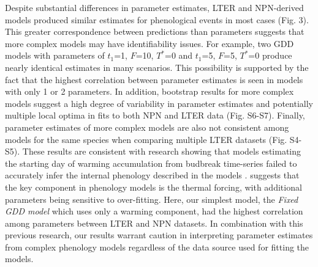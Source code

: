 \documentclass[fleqn,12pt,lineno]{article}
\begin{document}
Despite substantial differences in parameter estimates, LTER and NPN-derived models produced similar estimates for phenological events in most cases (Fig. 3). This greater correspondence between predictions than parameters suggests that more complex models may have identifiability issues. For example, two GDD models with parameters of $t_{1}$=1, $F$=10, $T^*$=0 and $t_{1}$=5, $F$=5, $T^*$=0 produce nearly identical estimates in many scenarios. This possibility is supported by the fact that the highest correlation between parameter estimates is seen in models with only 1 or 2 parameters. In addition, bootstrap results for more complex models suggest a high degree of variability in parameter estimates and potentially multiple local optima in fits to both NPN and LTER data (Fig. S6-S7). Finally, parameter estimates of more complex models are also not consistent among models for the same species when comparing multiple LTER datasets (Fig. S4-S5). These results are consistent with research showing that models estimating the starting day of warming accumulation from budbreak time-series failed to accurately infer the internal phenology described in the models \citep{chuine2016}. \cite{basler2016} suggests that the key component in phenology models is the thermal forcing, with additional parameters being sensitive to over-fitting. Here, our simplest model, the \textit{Fixed GDD model} which uses only a warming component, had the highest correlation among parameters between LTER and NPN datasets. In combination with this previous research, our results warrant caution in interpreting parameter estimates from complex phenology models regardless of the data source used for fitting the models.
\end{document}
